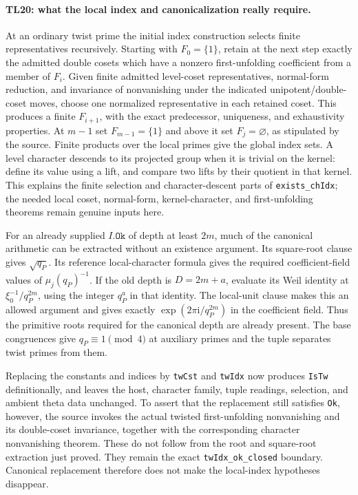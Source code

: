 \paragraph{TL20: what the local index and canonicalization really
require.}
At an ordinary twist prime the initial index construction selects
finite representatives recursively. Starting with $F_0=\{1\}$,
retain at the next step exactly the admitted double cosets which
have a nonzero first-unfolding coefficient from a member of $F_i$.
Given finite admitted level-coset representatives, normal-form
reduction, and invariance of nonvanishing under the indicated
unipotent/double-coset moves, choose one normalized representative
in each retained coset. This produces a finite $F_{i+1}$, with
the exact predecessor, uniqueness, and exhaustivity properties.
At $m-1$ set $F_{m-1}=\{1\}$ and above it set $F_j=\varnothing$,
as stipulated by the source. Finite products over the local
primes give the global index sets. A level character descends
to its projected group when it is trivial on the kernel:
define its value using a lift, and compare two lifts by their
quotient in that kernel. This explains the finite selection
and character-descent parts of \texttt{exists\_chIdx}; the
needed local coset, normal-form, kernel-character, and
first-unfolding theorems remain genuine inputs here.

For an already supplied $I.\texttt{Ok}$ of depth at least $2m$,
much of the canonical arithmetic can be extracted without an
existence argument. Its square-root clause gives $\sqrt{q_P}$.
Its reference local-character formula gives the required
coefficient-field values of $\mu_j(q_P)^{-1}$. If the old depth
is $D=2m+a$, evaluate its Weil identity at
$\xi_0^{-1}/q_P^{2m}$, using the integer $q_P^a$ in that
identity. The local-unit clause makes this an allowed argument
and gives exactly $\exp(2\pi\mathrm i/q_P^{2m})$ in the
coefficient field. Thus the primitive roots required for the
canonical depth are already present. The base congruences give
$q_P\equiv1\pmod4$ at auxiliary primes and the tuple separates
twist primes from them.

Replacing the constants and indices by \texttt{twCst} and
\texttt{twIdx} now produces \texttt{IsTw} definitionally,
and leaves the host, character family, tuple readings, selection,
and ambient theta data unchanged. To assert that the replacement
still satisfies \texttt{Ok}, however, the source invokes the
actual twisted first-unfolding nonvanishing and its double-coset
invariance, together with the corresponding character
nonvanishing theorem. These do not follow from the root and
square-root extraction just proved. They remain the exact
\texttt{twIdx\_ok\_closed} boundary. Canonical replacement
therefore does not make the local-index hypotheses disappear.

